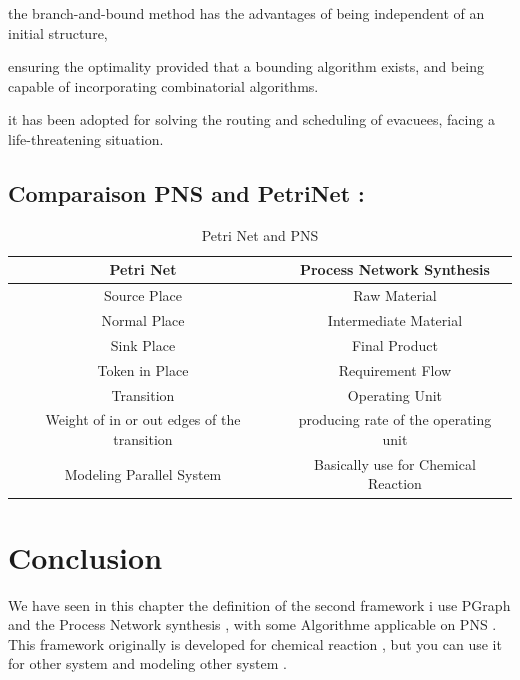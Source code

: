 the branch-and-bound method has the
advantages of being independent of an initial structure, 

ensuring the optimality
provided that a bounding algorithm exists, and being capable of incorporating
combinatorial algorithms.  \cite{algo}


it has been adopted for solving the routing and scheduling of evacuees, facing a life-threatening situation.  \cite{pns4}

\subsection{ Comparaison PNS and PetriNet : }
\begin {table}[H] 
\begin{tabular}{cc}

\hline 
\textbf{Petri Net}  & \textbf{Process Network Synthesis}\tabularnewline
\hline 
Source Place  & Raw Material\tabularnewline
Normal Place  & Intermediate Material\tabularnewline
Sink Place  & Final Product\tabularnewline
Token in Place  & Requirement Flow \tabularnewline
Transition  & Operating Unit \tabularnewline
Weight of in or out edges of the  transition & producing rate of the operating unit\tabularnewline
\hline 
Modeling Parallel System  & Basically use for Chemical Reaction \tabularnewline
\hline 

\end{tabular}
\caption {Petri Net and PNS}
 
\end {table}

\section{Conclusion}
We have seen in this chapter the definition of the second framework i use
PGraph and the Process Network synthesis , with some Algorithme applicable on PNS .
This framework originally is developed for chemical reaction , but you can use it for other system and modeling other system .

